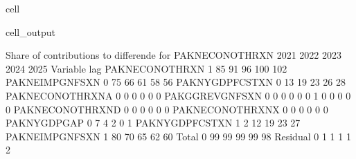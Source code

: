 \documentclass[letterpaper,10pt,english]{jupyterBook}
\begin{document}
\begin{sphinxuseclass}{cell}
\begin{sphinxVerbatimOutput}
\begin{sphinxuseclass}{cell_output}
\begin{sphinxVerbatim}[commandchars=\\\{\}]
 Share of contributions to differende for  PAKNECONOTHRXN
                            2021        2022        2023        2024        2025
Variable         lag                                                            
PAKNECONOTHRXN   \PYGZhy{}1          85\PYGZpc{}         91\PYGZpc{}         96\PYGZpc{}        100\PYGZpc{}        102\PYGZpc{}
PAKNEIMPGNFSXN    0          75\PYGZpc{}         66\PYGZpc{}         61\PYGZpc{}         58\PYGZpc{}         56\PYGZpc{}
PAKNYGDPFCSTXN    0          13\PYGZpc{}         19\PYGZpc{}         23\PYGZpc{}         26\PYGZpc{}         28\PYGZpc{}
PAKNECONOTHRXN\PYGZus{}A  0          \PYGZhy{}0\PYGZpc{}         \PYGZhy{}0\PYGZpc{}         \PYGZhy{}0\PYGZpc{}         \PYGZhy{}0\PYGZpc{}         \PYGZhy{}0\PYGZpc{}
PAKGGREVGNFSXN    0          \PYGZhy{}0\PYGZpc{}         \PYGZhy{}0\PYGZpc{}         \PYGZhy{}0\PYGZpc{}         \PYGZhy{}0\PYGZpc{}         \PYGZhy{}0\PYGZpc{}
                 \PYGZhy{}1          \PYGZhy{}0\PYGZpc{}         \PYGZhy{}0\PYGZpc{}         \PYGZhy{}0\PYGZpc{}         \PYGZhy{}0\PYGZpc{}         \PYGZhy{}0\PYGZpc{}
PAKNECONOTHRXN\PYGZus{}D  0          \PYGZhy{}0\PYGZpc{}         \PYGZhy{}0\PYGZpc{}         \PYGZhy{}0\PYGZpc{}         \PYGZhy{}0\PYGZpc{}         \PYGZhy{}0\PYGZpc{}
PAKNECONOTHRXN\PYGZus{}X  0          \PYGZhy{}0\PYGZpc{}         \PYGZhy{}0\PYGZpc{}         \PYGZhy{}0\PYGZpc{}         \PYGZhy{}0\PYGZpc{}         \PYGZhy{}0\PYGZpc{}
PAKNYGDPGAP\PYGZus{}      0           7\PYGZpc{}          4\PYGZpc{}          2\PYGZpc{}          0\PYGZpc{}         \PYGZhy{}1\PYGZpc{}
PAKNYGDPFCSTXN   \PYGZhy{}1          \PYGZhy{}2\PYGZpc{}        \PYGZhy{}12\PYGZpc{}        \PYGZhy{}19\PYGZpc{}        \PYGZhy{}23\PYGZpc{}        \PYGZhy{}27\PYGZpc{}
PAKNEIMPGNFSXN   \PYGZhy{}1         \PYGZhy{}80\PYGZpc{}        \PYGZhy{}70\PYGZpc{}        \PYGZhy{}65\PYGZpc{}        \PYGZhy{}62\PYGZpc{}        \PYGZhy{}60\PYGZpc{}
Total             0          99\PYGZpc{}         99\PYGZpc{}         99\PYGZpc{}         99\PYGZpc{}         98\PYGZpc{}
Residual          0          \PYGZhy{}1\PYGZpc{}         \PYGZhy{}1\PYGZpc{}         \PYGZhy{}1\PYGZpc{}         \PYGZhy{}1\PYGZpc{}         \PYGZhy{}2\PYGZpc{}


\end{sphinxVerbatim}
\end{sphinxuseclass}
\end{sphinxVerbatimOutput}
\end{sphinxuseclass}
\end{document}
